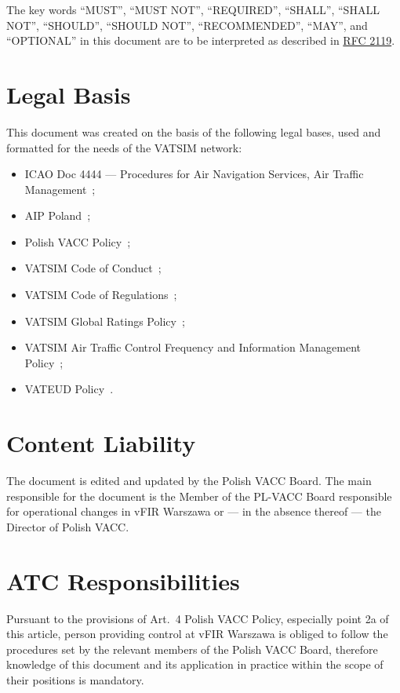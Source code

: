 The key words ``MUST'', ``MUST NOT'', ``REQUIRED'', ``SHALL'', ``SHALL
      NOT'', ``SHOULD'', ``SHOULD NOT'', ``RECOMMENDED'',  ``MAY'', and
      ``OPTIONAL'' in this document are to be interpreted as described in
      \href{https://www.rfc-editor.org/rfc/rfc2119}{RFC 2119}.

\section{Legal Basis}
This document was created on the basis of the following legal bases, used and formatted for the needs of the VATSIM network:
\begin{itemize}
    \item ICAO Doc 4444 --- Procedures for Air Navigation Services, Air Traffic Management~\cite{4444};
    \item AIP Poland~\cite{aip};
    \item Polish VACC Policy~\cite{policy};
    \item VATSIM Code of Conduct~\cite{coc};
    \item VATSIM Code of Regulations~\cite{cor};
    \item VATSIM Global Ratings Policy~\cite{grp};
    \item VATSIM Air Traffic Control Frequency and Information Management Policy~\cite{atis};
    \item VATEUD Policy~\cite{vateud}.
\end{itemize}

\section{Content Liability}
The document is edited and updated by the Polish VACC Board. The main responsible for the document is the Member of the PL-VACC Board responsible for operational changes in vFIR Warszawa or --- in the absence thereof --- the Director of Polish VACC\@.

\section{ATC Responsibilities}
Pursuant to the provisions of Art.\ 4 Polish VACC Policy, especially point 2a of this article, person providing control at vFIR Warszawa is obliged to follow the procedures set by the relevant members of the Polish VACC Board, therefore knowledge of this document and its application in practice within the scope of their positions is mandatory.